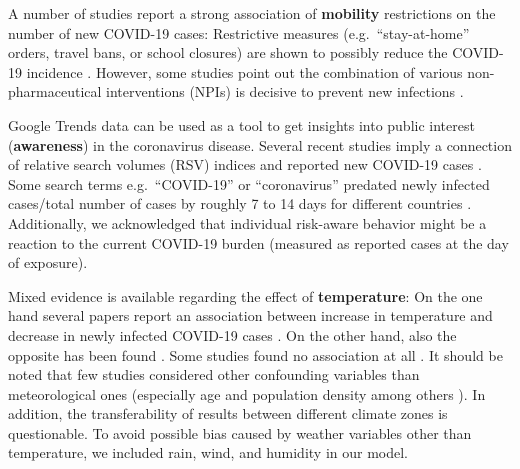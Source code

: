 \documentclass[]{elsarticle} %
\begin{document}
A number of studies report a strong association of \textbf{mobility} restrictions on the number of new COVID-19 cases: Restrictive measures (e.g.~``stay-at-home'' orders, travel bans, or school closures) are shown to possibly reduce the COVID-19 incidence \citep{chang_modeling_2020, Chinazzi395, fowler_effect_2020, kraemer_effect_2020, lasry_timing_2020, linka_outbreak_2020, mazzoli_effects_2020, xiong_data-driven_2020}. However, some studies point out the combination of various non-pharmaceutical interventions (NPIs) is decisive to prevent new infections \citep{juni_impact_2020, lai_effect_2020}.

Google Trends \citep{google_trends} data can be used as a tool to get insights into public interest (\textbf{awareness}) in the coronavirus disease. Several recent studies imply a connection of relative search volumes (RSV) indices and reported new COVID-19 cases \citep{ayyoubzadeh_predicting_2020, effenberger_association_2020, higgins_correlations_2020, li_retrospective_2020, lin_google_2020, mavragani_tracking_2020, walker_use_2020, yuan_trends_2020, zhou_effects_2020}. Some search terms e.g.~``COVID-19'' or ``coronavirus'' predated newly infected cases/total number of cases by roughly 7 to 14 days for different countries \citep{effenberger_association_2020, higgins_correlations_2020, li_retrospective_2020, yuan_trends_2020}. Additionally, we acknowledged that individual risk-aware behavior might be a reaction to the current COVID-19 burden (measured as reported cases at the day of exposure).

Mixed evidence is available regarding the effect of \textbf{temperature}: On the one hand several papers report an association between increase in temperature and decrease in newly infected COVID-19 cases \citep{bannister-tyrrell_preliminary_2020, demongeot_temperature_2020, liu_impact_2020, qi_covid-19_2020, shi_impact_2020, sobral_association_2020, tosepu_correlation_2020, Wang2020temperature, wu_effects_2020}. On the other hand, also the opposite has been found \citep{auler_evidence_2020, xie_association_2020}. Some studies found no association at all \citep{briz-redon_spatio-temporal_2020, iqbal_nexus_2020, jahangiri_sensitivity_2020, juni_impact_2020, yao_no_2020}. It should be noted that few studies considered other confounding variables than meteorological ones (especially age and population density among others \citep{briz-redon_spatio-temporal_2020, juni_impact_2020, wu_effects_2020}). In addition, the transferability of results between different climate zones is questionable. To avoid possible bias caused by weather variables other than temperature, we included rain, wind, and humidity in our model.
\end{document}

